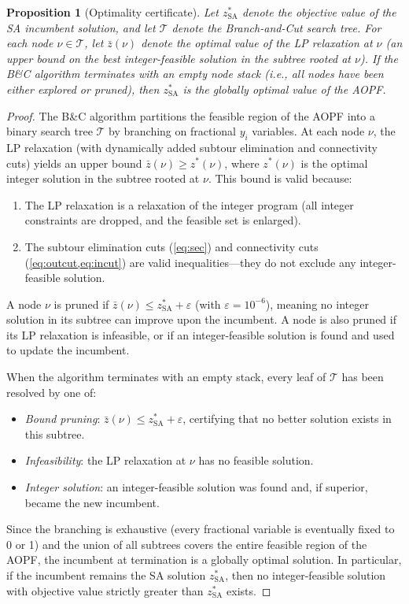 \documentclass[preprint,11pt]{elsarticle}
\newtheorem{proposition}{Proposition}
\begin{document}
\begin{proposition}[Optimality certificate]
\label{prop:optimality}
Let $z^*_{\text{SA}}$ denote the objective value of the SA incumbent solution, and let $\mathcal{T}$ denote the Branch-and-Cut search tree.
For each node $\nu \in \mathcal{T}$, let $\bar{z}(\nu)$ denote the optimal value of the LP relaxation at $\nu$ (an upper bound on the best integer-feasible solution in the subtree rooted at $\nu$).
If the B\&C algorithm terminates with an empty node stack (i.e., all nodes have been either explored or pruned), then $z^*_{\text{SA}}$ is the globally optimal value of the AOPF.
\end{proposition}

\begin{proof}
The B\&C algorithm partitions the feasible region of the AOPF into a binary search tree $\mathcal{T}$ by branching on fractional $y_i$ variables.
At each node $\nu$, the LP relaxation (with dynamically added subtour elimination and connectivity cuts) yields an upper bound $\bar{z}(\nu) \geq z^*(\nu)$, where $z^*(\nu)$ is the optimal integer solution in the subtree rooted at $\nu$.
This bound is valid because:
\begin{enumerate}[nosep]
  \item The LP relaxation is a relaxation of the integer program (all integer constraints are dropped, and the feasible set is enlarged).
  \item The subtour elimination cuts (\cref{eq:sec}) and connectivity cuts (\cref{eq:outcut,eq:incut}) are valid inequalities---they do not exclude any integer-feasible solution.
\end{enumerate}

A node $\nu$ is pruned if $\bar{z}(\nu) \leq z^*_{\text{SA}} + \varepsilon$ (with $\varepsilon = 10^{-6}$), meaning no integer solution in its subtree can improve upon the incumbent.
A node is also pruned if its LP relaxation is infeasible, or if an integer-feasible solution is found and used to update the incumbent.

When the algorithm terminates with an empty stack, every leaf of $\mathcal{T}$ has been resolved by one of:
\begin{itemize}[nosep]
  \item \emph{Bound pruning}: $\bar{z}(\nu) \leq z^*_{\text{SA}} + \varepsilon$, certifying that no better solution exists in this subtree.
  \item \emph{Infeasibility}: the LP relaxation at $\nu$ has no feasible solution.
  \item \emph{Integer solution}: an integer-feasible solution was found and, if superior, became the new incumbent.
\end{itemize}

Since the branching is exhaustive (every fractional variable is eventually fixed to 0 or 1) and the union of all subtrees covers the entire feasible region of the AOPF, the incumbent at termination is a globally optimal solution.
In particular, if the incumbent remains the SA solution $z^*_{\text{SA}}$, then no integer-feasible solution with objective value strictly greater than $z^*_{\text{SA}}$ exists.
\end{proof}
\end{document}
